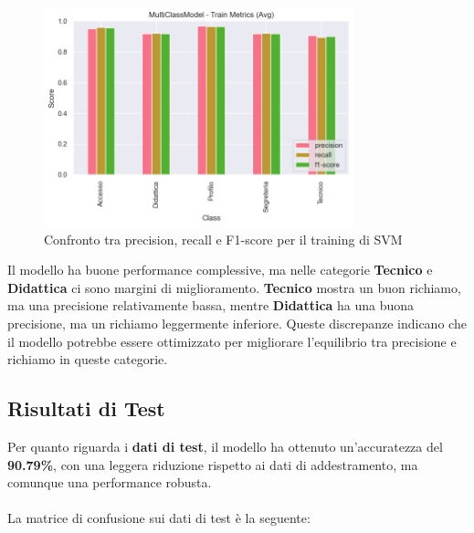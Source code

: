 \begin{figure}[H]
    \centering
    \includegraphics[width=0.8\textwidth]{images/metrics_train_svm.png}
    \caption{Confronto tra precision, recall e F1-score per il training di SVM}
    \label{fig:metrics_train_svm}
\end{figure}

Il modello ha buone performance complessive, ma nelle categorie \textbf{Tecnico} e \textbf{Didattica} ci sono margini di miglioramento. \textbf{Tecnico} mostra un buon richiamo, ma una precisione relativamente bassa, mentre \textbf{Didattica} ha una buona precisione, ma un richiamo leggermente inferiore. Queste discrepanze indicano che il modello potrebbe essere ottimizzato per migliorare l'equilibrio tra precisione e richiamo in queste categorie.

\newpage

\subsection{Risultati di Test}

Per quanto riguarda i \textbf{dati di test}, il modello ha ottenuto un'accuratezza del \textbf{90.79\%}, con una leggera riduzione rispetto ai dati di addestramento, ma comunque una performance robusta. \\ \\
La matrice di confusione sui dati di test è la seguente:

